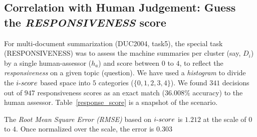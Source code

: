 \documentclass[a4paper]{report}
\begin{document}
\subsection{Correlation with Human Judgement: Guess the \emph{RESPONSIVENESS} score}
\label{responsiveness}

For multi-document summarization (DUC2004, task5), the special task (RESPONSIVENESS) was to assess the machine summaries per cluster (say, $D_i$) by a single human-assessor ($h_a$) and score between $0$ to $4$, to reflect the \emph{responsiveness} on a given topic (question). We have used a \emph{histogram} to divide the $i\hbox{-}score$ based space into $5$ categories ($\{0,1,2,3,4\}$). We found $341$ decisions out of $947$ responsiveness scores as an exact match ($36.008\%$ accuracy) to the human assessor. Table~\ref{response_score} is a snapshot of the scenario.
\par The \emph{Root Mean Square Error (RMSE)} based on $i\hbox{-}score$ is $1.212$ at the scale of $0$ to $4$. Once normalized over the scale, the error is $0.303$
\end{document}
